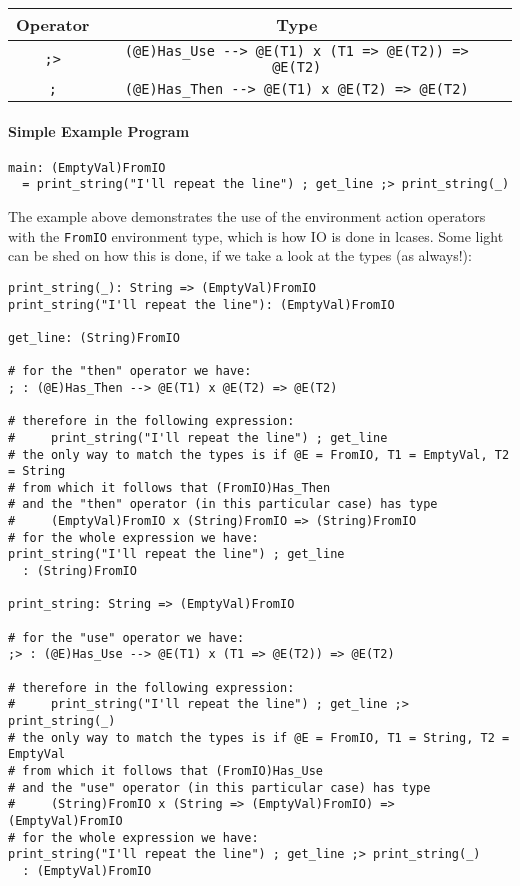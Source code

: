 \documentclass{article}
\begin{document}
\begin{center}
\begin{tabular}{ |c|c|c| }
\hline
Operator & Type
\\
\hline
\hline
\verb|;>| & \verb|(@E)Has_Use --> @E(T1) x (T1 => @E(T2)) => @E(T2)|
\\
\hline
\verb|;| & \verb|(@E)Has_Then --> @E(T1) x @E(T2) => @E(T2)|
\\
\hline
\end{tabular}
\end{center}

\paragraph{Simple Example Program}
\begin{verbatim}
main: (EmptyVal)FromIO
  = print_string("I'll repeat the line") ; get_line ;> print_string(_)
\end{verbatim}
The example above demonstrates the use of the environment action operators with
the \verb|FromIO| environment type, which is how IO is done in lcases. Some
light can be shed on how this is done, if we take a look at the types (as
always!):
\begin{verbatim}
print_string(_): String => (EmptyVal)FromIO
print_string("I'll repeat the line"): (EmptyVal)FromIO

get_line: (String)FromIO

# for the "then" operator we have:
; : (@E)Has_Then --> @E(T1) x @E(T2) => @E(T2)

# therefore in the following expression:
#     print_string("I'll repeat the line") ; get_line
# the only way to match the types is if @E = FromIO, T1 = EmptyVal, T2 = String
# from which it follows that (FromIO)Has_Then
# and the "then" operator (in this particular case) has type
#     (EmptyVal)FromIO x (String)FromIO => (String)FromIO
# for the whole expression we have:
print_string("I'll repeat the line") ; get_line
  : (String)FromIO

print_string: String => (EmptyVal)FromIO

# for the "use" operator we have:
;> : (@E)Has_Use --> @E(T1) x (T1 => @E(T2)) => @E(T2)

# therefore in the following expression:
#     print_string("I'll repeat the line") ; get_line ;> print_string(_)
# the only way to match the types is if @E = FromIO, T1 = String, T2 = EmptyVal
# from which it follows that (FromIO)Has_Use
# and the "use" operator (in this particular case) has type
#     (String)FromIO x (String => (EmptyVal)FromIO) => (EmptyVal)FromIO
# for the whole expression we have:
print_string("I'll repeat the line") ; get_line ;> print_string(_)
  : (EmptyVal)FromIO
\end{verbatim}
\end{document}
